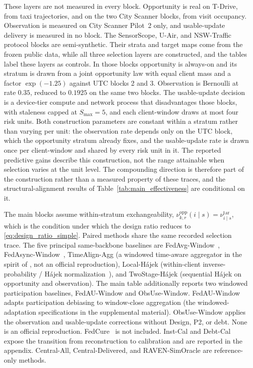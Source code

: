 \documentclass[letterpaper,journal]{IEEEtran}
\begin{document}
These layers are not measured in every block.  Opportunity is real on T-Drive,
from taxi trajectories, and on the two City Scanner blocks, from visit
occupancy.  Observation is measured on City Scanner Pilot~2 only, and
usable-update delivery is measured in no block.  The SensorScope, U-Air, and
NSW-Traffic protocol blocks are semi-synthetic.  Their strata and target maps
come from the frozen public data, while all three selection layers are
constructed, and the tables label these layers as controls.  In those blocks
opportunity is always-on and its stratum is drawn from a joint opportunity law
with equal client mass and a factor $\exp(-1.25)$ against UTC blocks 2 and 3.
Observation is Bernoulli at rate $0.35$, reduced to $0.1925$ on the same two
blocks.  The usable-update decision is a device-tier compute and network
process that disadvantages those blocks, with staleness capped at
$S_{\max}=5$, and each client-window draws at most four risk units.  Both
construction parameters are constant within a stratum rather than varying per
unit: the observation rate depends only on the UTC block, which the
opportunity stratum already fixes, and the usable-update rate is drawn once
per client-window and shared by every risk unit in it.  The reported
predictive gains describe this construction, not the range attainable when
selection varies at the unit level.  The
compounding direction is therefore part of the construction rather than a
measured property of these traces, and the structural-alignment results of
Table~\ref{tab:main_effectiveness} are conditional on it.

The main blocks assume within-stratum exchangeability,
$\nu^{\mathrm{opp}}_{k,r}(i\mid s)=\nu^{\mathrm{tar}}_{i\mid s}$, which is the
condition under which the design ratio reduces to
\eqref{eq:design_ratio_simple}.  Paired methods share the same recorded selection trace.
The five principal same-backbone baselines are
FedAvg-Window~\cite{mcmahan2017communication},
FedAsync-Window~\cite{xie2019asynchronous},
TimeAlign-Agg (a windowed time-aware aggregator in the spirit of
\cite{wang2026federated}, not an official reproduction),
Local-H\'ajek (within-client inverse-probability / H\'ajek
normalization~\cite{horvitz1952generalization,hajek1971comment}), and
TwoStage-H\'ajek (sequential H\'ajek on opportunity and
observation).  The main table additionally
reports two windowed participation baselines, FedAU-Window and
ObsUse-Window.  FedAU-Window adapts participation debiasing
\cite{wang2024lightweight} to window-close aggregation
(the windowed-adaptation specifications in the supplemental material).
ObsUse-Window applies the observation and usable-update
corrections without Design, P2, or debt.  None is an official
reproduction.  FedCure~\cite{chen2026fedcure} is not included.  Inst-Cal and Debt-Cal
expose the transition from reconstruction to calibration and are
reported in the appendix.  Central-All, Central-Delivered, and
RAVEN-SimOracle are reference-only methods.
\end{document}
